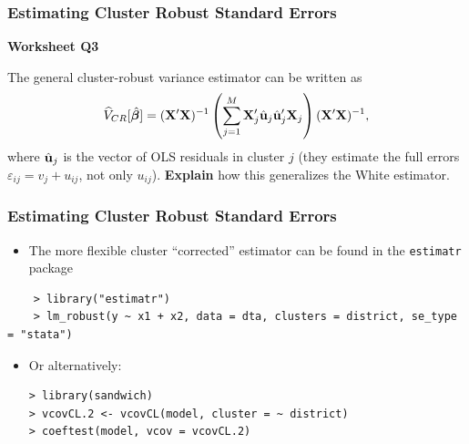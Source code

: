 \documentclass[xcolor=svgnames,9pt,english,aspectratio=169,t]{beamer}
\begin{document}
\begin{frame}[fragile]
\frametitle{Estimating Cluster Robust Standard Errors}

\textbf{Worksheet Q3}\medskip

The general cluster-robust variance estimator can be written as  
\[
\widehat{V}_{CR}[\hat{\boldsymbol{\beta}}] = (\mathbf{X}'\mathbf{X})^{-1}\left(\sum_{j=1}^M \mathbf{X}_j'\hat{\mathbf{u}}_j\hat{\mathbf{u}}_j'\mathbf{X}_j\right)(\mathbf{X}'\mathbf{X})^{-1},
\]
where $\hat{\mathbf{u}}_j$ is the vector of OLS residuals in cluster $j$ (they estimate the full errors $\varepsilon_{ij} = v_j + u_{ij}$, not only $u_{ij}$).  
\textbf{Explain} how this generalizes the White estimator.

\end{frame}



\begin{frame}[fragile]
\frametitle{Estimating Cluster Robust Standard Errors}
{\small
\begin{itemize}
\item The more flexible cluster ``corrected'' estimator can be found in the \texttt{estimatr} package
\end{itemize}

\begin{verbatim}
    > library("estimatr")
    > lm_robust(y ~ x1 + x2, data = dta, clusters = district, se_type = "stata")
\end{verbatim}

\begin{itemize}
\item Or alternatively:\vspace{-.05in}
\begin{verbatim}
> library(sandwich)
> vcovCL.2 <- vcovCL(model, cluster = ~ district)
> coeftest(model, vcov = vcovCL.2)
\end{verbatim}
\end{itemize}
}
\end{frame}

%
%
\end{document}

